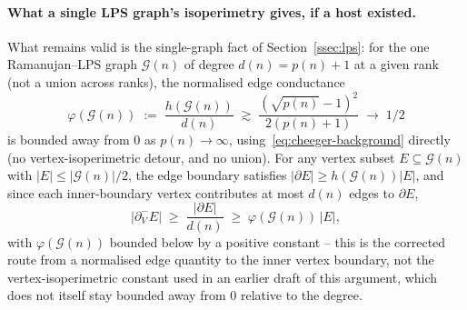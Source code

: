 \documentclass[11pt,a4paper]{article}
\theoremstyle{definition}
\theoremstyle{remark}
\begin{document}
    \paragraph{What a single LPS graph's isoperimetry gives, if a host existed.}
    What remains valid is the single-graph fact of Section~\ref{ssec:lps}: for the one
    Ramanujan--LPS graph $\mathcal G(n)$ of degree $d(n)=p(n)+1$ at a given rank (not a union
    across ranks), the normalised edge conductance
    \[
    \varphi(\mathcal G(n)) \;:=\; \frac{h(\mathcal G(n))}{d(n)}
    \;\gtrsim\; \frac{(\sqrt{p(n)}-1)^2}{2(p(n)+1)} \;\to\; 1/2
    \]
    is bounded away from $0$ as $p(n)\to\infty$, using~\eqref{eq:cheeger-background} directly
    (no vertex-isoperimetric detour, and no union).
    For any vertex subset $E \subseteq \mathcal G(n)$ with $|E|\leq|\mathcal G(n)|/2$, the edge
    boundary satisfies $|\partial E| \geq h(\mathcal G(n))|E|$, and since each inner-boundary
    vertex contributes at most $d(n)$ edges to $\partial E$,
    \begin{equation}
      \label{eq:tension-inner}
      |\partial^-_V E| \;\geq\; \frac{|\partial E|}{d(n)} \;\geq\; \varphi(\mathcal G(n))\,|E|,
    \end{equation}
    with $\varphi(\mathcal G(n))$ bounded below by a positive constant -- this is the
    corrected route from a normalised edge quantity to the inner vertex boundary, not the
    vertex-isoperimetric constant used in an earlier draft of this argument, which does not
    itself stay bounded away from $0$ relative to the degree.
\end{document}
